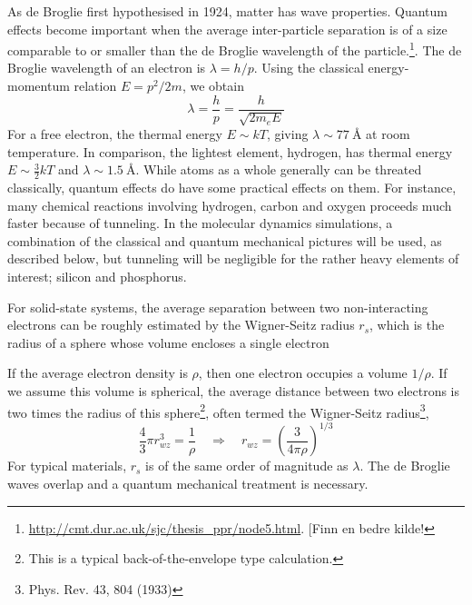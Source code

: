 \documentclass[11pt,bibliography=totoc,index=totoc]{scrbook}   %
\begin{document}

As de Broglie first hypothesised in 1924,\cite{deBroglie:1924} matter has wave
properties. Quantum effects become important when the average inter-particle
separation is of a size comparable to or smaller than the de Broglie wavelength 
of the particle.\footnote{\url{http://cmt.dur.ac.uk/sjc/thesis_ppr/node5.html}. [Finn
en bedre kilde!}. The de Broglie wavelength of an electron is $\lambda=h/p$.
Using the classical energy-momentum relation $E=p^2/2m$, we obtain
\begin{equation}
  \lambda = \frac{h}{p} = \frac{h}{\sqrt{2m_eE}} 
  \label{eq:deBroglieWavelength}
\end{equation}
For a free electron, the thermal energy $E\sim kT$, 
giving $\lambda\sim\SI{77}{\angstrom}$ at
room temperature. In comparison, the lightest element, hydrogen, has thermal
energy $E\sim\frac32 kT$ and 
$\lambda\sim\SI{1.5}{\angstrom}$. While atoms as a whole generally can be 
threated classically, quantum effects do have some practical effects on them.
For instance, many chemical reactions involving hydrogen, carbon and oxygen 
proceeds much faster because of tunneling. In the molecular dynamics simulations, 
a combination of the classical and quantum mechanical pictures will be used, as 
described below, but tunneling will be negligible for the rather heavy elements 
of interest; silicon and phosphorus.

For solid-state systems, the average separation between two non-interacting
electrons can be roughly estimated by the Wigner-Seitz radius $r_s$, 
which is the radius of a sphere whose volume encloses a single electron

If the average electron density is $\rho$, then one electron occupies a volume
$1/\rho$. If we assume this volume is spherical, the average distance between
two electrons is two times the radius of this sphere\footnote{This is a
typical back-of-the-envelope type calculation.}, often termed the 
Wigner-Seitz radius\footnote{Phys. Rev. 43, 804 (1933)},
\begin{equation}
  \frac43\pi r_{wz}^3 = \frac{1}{\rho}\quad
  \Rightarrow \quad r_{wz} = \left(\frac{3}{4\pi\rho}\right)^{1/3}
  \label{eq:wigner-seitz}
\end{equation}
For typical materials, $r_s$ is of the same order of magnitude as $\lambda$. The
de Broglie waves overlap and a quantum mechanical treatment is necessary.
\end{document}
